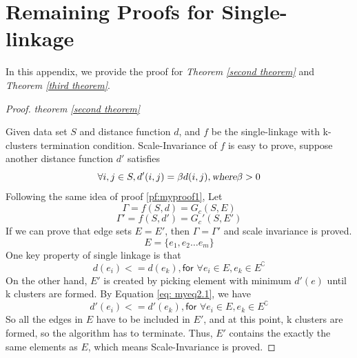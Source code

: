 \documentclass{uonmathreport}
\begin{document}
\appendix

\section{Remaining Proofs for Single-linkage} \label{app:proof}
In this appendix, we provide the proof for \textit{Theorem \ref{second theorem}} and  \textit{Theorem \ref{third theorem}}.
\begin{proof}
\textit{theorem \ref{second theorem}}

\noindent Given data set $S$ and distance function $d$, and $f$ be the single-linkage with k-clusters termination condition. Scale-Invariance of $f$ is easy to prove, suppose another distance function $d'$ satisfies
\begin{equation}
\label{eq: myeq2.1}
	\forall i,j \in S, d'(i,j)=\beta d(i,j), \textsl{where} \beta >0
\end{equation}
Following the same idea of proof \ref{pf:myproof1}, Let 
\begin{equation}
\label{eq: myeq2.2}
\Gamma = f(S,d) = G_c(S,E)
\end{equation}
\begin{equation}
\Gamma' = f(S,d') = G_c'(S,E')
\end{equation}
If we can prove that edge sets $E=E'$, then $\Gamma = \Gamma'$ and scale invariance is proved.  
\begin{equation}
E = \{e_1,e_2\ldots e_m\}
\end{equation}
One key property of single linkage is that 
\begin{equation}
 d(e_i)<=d(e_k), \textsf{for } \forall e_i\in E, e_k\in E^\complement
\end{equation}
On the other hand, $E'$ is created by picking element with minimum  $d'(e)$ until k clusters are formed. By Equation \ref{eq: myeq2.1}, we have  
 \begin{equation}
 d'(e_i)<=d'(e_k), \textsf{for } \forall e_i\in E, e_k\in E^\complement
\end{equation}
So all the edges in $E$ have to be included in $E'$, and at this point, k clusters are formed, so the algorithm has to terminate. Thus, $E'$ contains the exactly the same elements as $E$, which means Scale-Invariance is proved.


\end{proof}
\end{document}

